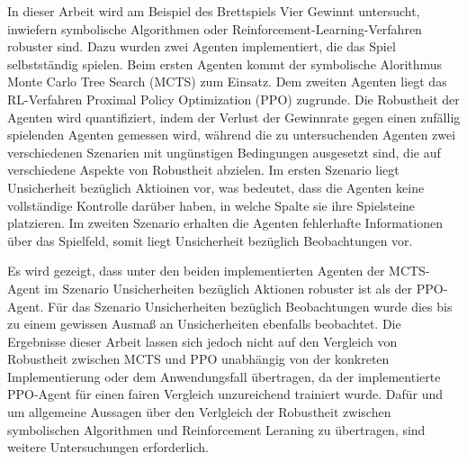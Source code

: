 In dieser Arbeit wird am Beispiel des Brettspiels Vier Gewinnt untersucht, inwiefern symbolische Algorithmen oder Reinforcement-Learning-Verfahren robuster sind. Dazu wurden zwei Agenten implementiert, die das Spiel selbstständig spielen. Beim ersten Agenten kommt der symbolische Alorithmus Monte Carlo Tree Search (MCTS) zum Einsatz. Dem zweiten Agenten liegt das RL-Verfahren Proximal Policy Optimization (PPO) zugrunde. Die Robustheit der Agenten wird quantifiziert, indem der Verlust der Gewinnrate gegen einen zufällig spielenden Agenten gemessen wird, während die zu untersuchenden Agenten zwei verschiedenen Szenarien mit ungünstigen Bedingungen ausgesetzt sind, die auf verschiedene Aspekte von Robustheit abzielen. Im ersten Szenario liegt Unsicherheit bezüglich Aktioinen vor, was bedeutet, dass die Agenten keine vollständige Kontrolle darüber haben, in welche Spalte sie ihre Spielsteine platzieren. Im zweiten Szenario erhalten die Agenten fehlerhafte Informationen über das Spielfeld, somit liegt Unsicherheit bezüglich Beobachtungen vor.

Es wird gezeigt, dass unter den beiden implementierten Agenten der MCTS-Agent im Szenario Unsicherheiten bezüglich Aktionen robuster ist als der PPO-Agent. Für das Szenario Unsicherheiten bezüglich Beobachtungen wurde dies bis zu einem gewissen Ausmaß an Unsicherheiten ebenfalls beobachtet. Die Ergebnisse dieser Arbeit lassen sich jedoch nicht auf den Vergleich von Robustheit zwischen MCTS und PPO unabhängig von der konkreten Implementierung oder dem Anwendungsfall übertragen, da der implementierte PPO-Agent für einen fairen Vergleich unzureichend trainiert wurde. Dafür und um allgemeine Aussagen über den Verlgleich der Robustheit zwischen symbolischen Algorithmen und Reinforcement Leraning zu übertragen, sind weitere Untersuchungen erforderlich.

\newpage